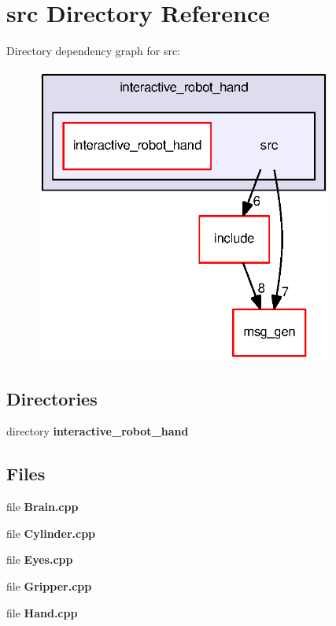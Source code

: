 \section{src Directory Reference}
\label{dir_34df673508a04c0641bb468aed6919eb}
Directory dependency graph for src\-:
\nopagebreak
\begin{figure}[H]
\begin{center}
\leavevmode
\includegraphics[width=278pt]{dir_34df673508a04c0641bb468aed6919eb_dep}
\end{center}
\end{figure}
\subsection*{Directories}
\begin{DoxyCompactItemize}
\item 
directory {\bf interactive\-\_\-robot\-\_\-hand}
\end{DoxyCompactItemize}
\subsection*{Files}
\begin{DoxyCompactItemize}
\item 
file {\bf Brain.\-cpp}
\item 
file {\bf Cylinder.\-cpp}
\item 
file {\bf Eyes.\-cpp}
\item 
file {\bf Gripper.\-cpp}
\item 
file {\bf Hand.\-cpp}
\end{DoxyCompactItemize}
